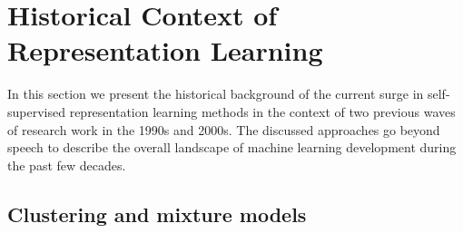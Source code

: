 
\section{Historical Context of Representation Learning}

\label{sec:thirdwave}

In this section we present the historical background of the current surge in
self-supervised representation learning methods in the context of two previous
waves of research work in the 1990s and 2000s. The discussed approaches go
beyond speech to describe the overall landscape of machine learning development during the
past few decades.

\subsection{Clustering and mixture models}


